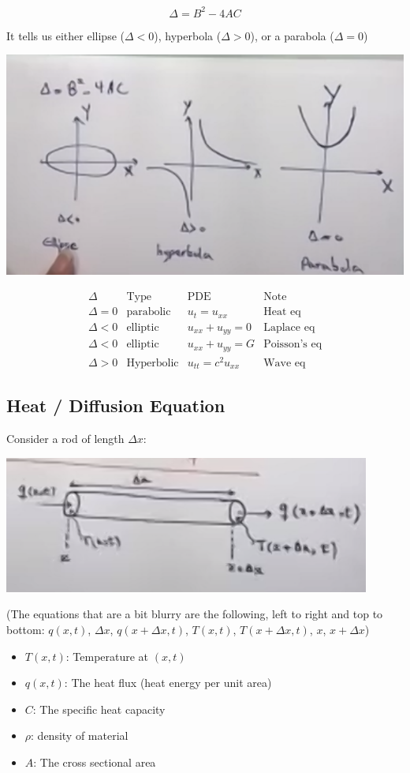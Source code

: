 $$\Delta = B^2 - 4AC$$

It tells us either ellipse ($\Delta < 0$), hyperbola ($\Delta > 0$), or a parabola ($\Delta = 0$)

\includegraphics[width = 0.9 \textwidth]{image2.png}

$$\begin{matrix} 
\Delta & \text{Type} & \text{PDE} & \text{Note} \\ 
\Delta = 0 & \text{parabolic} & u_t = u_{xx} & \text{Heat eq} \\ 
\Delta < 0 & \text{elliptic} & u_{xx} + u_{yy} = 0 & \text{Laplace eq} \\
\Delta < 0 & \text{elliptic} & u_{xx} + u_{yy} = G & \text{Poisson's eq} \\
\Delta > 0 & \text{Hyperbolic} & u_{tt} = c^2 u_{xx} & \text{Wave eq}
\end{matrix}$$

\hfill

\subsection{Heat / Diffusion Equation}

Consider a rod of length $\Delta x$:

\includegraphics[width = 0.9 \textwidth]{image3.png}

\hfill

(The equations that are a bit blurry are the following, left to right and top to bottom: $q(x,t)$, $\Delta x$, $q(x + \Delta x, t)$, $T(x,t)$, $T(x + \Delta x, t)$, $x$, $x + \Delta x$)
\begin{itemize}
    \item $T(x,t)$: Temperature at $(x,t)$
    \item $q(x,t)$: The heat flux (heat energy per unit area)
    \item $C$: The specific heat capacity
    \item $\rho$: density of material
    \item $A$: The cross sectional area
\end{itemize}


